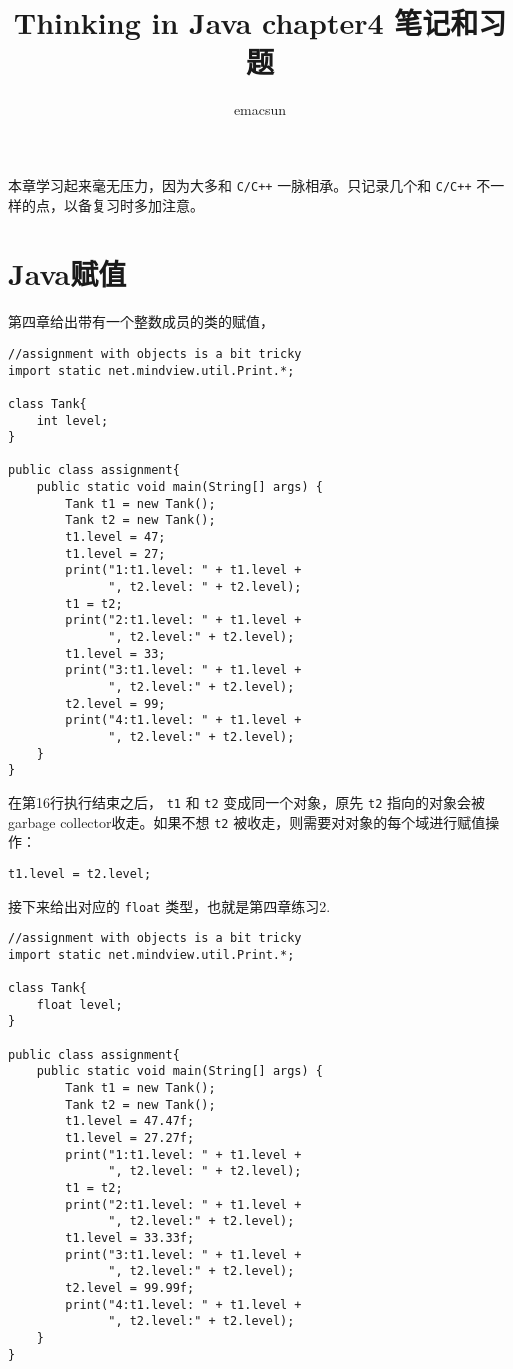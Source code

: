 \documentclass[10pt,a4paper,UTF8]{article}
\author{emacsun}
\date{}
\title{Thinking in Java chapter4 笔记和习题}
\begin{document}
\maketitle
\tableofcontents

本章学习起来毫无压力，因为大多和 \texttt{C/C++} 一脉相承。只记录几个和 \texttt{C/C++} 不一样的点，以备复习时多加注意。

\section{Java赋值}
\label{sec:orgheadline1}


第四章给出带有一个整数成员的类的赋值，
\lstset{language=java,label= ,caption= ,captionpos=b,firstnumber=1,numbers=left}
\begin{lstlisting}
//assignment with objects is a bit tricky
import static net.mindview.util.Print.*;

class Tank{
    int level;
}

public class assignment{
    public static void main(String[] args) {
        Tank t1 = new Tank();
        Tank t2 = new Tank();
        t1.level = 47;
        t1.level = 27;
        print("1:t1.level: " + t1.level +
              ", t2.level: " + t2.level);
        t1 = t2;
        print("2:t1.level: " + t1.level +
              ", t2.level:" + t2.level);
        t1.level = 33;
        print("3:t1.level: " + t1.level +
              ", t2.level:" + t2.level);
        t2.level = 99;
        print("4:t1.level: " + t1.level +
              ", t2.level:" + t2.level);
    }
}
\end{lstlisting}
在第16行执行结束之后， \texttt{t1} 和 \texttt{t2} 变成同一个对象，原先 \texttt{t2} 指向的对象会被garbage collector收走。如果不想 \texttt{t2} 被收走，则需要对对象的每个域进行赋值操作：

\lstset{language=java,label= ,caption= ,captionpos=b,numbers=none}
\begin{lstlisting}
t1.level = t2.level;
\end{lstlisting}


接下来给出对应的 \texttt{float} 类型，也就是第四章练习2.

\lstset{language=java,label= ,caption= ,captionpos=b,firstnumber=1,numbers=left}
\begin{lstlisting}
//assignment with objects is a bit tricky
import static net.mindview.util.Print.*;

class Tank{
    float level;
}

public class assignment{
    public static void main(String[] args) {
        Tank t1 = new Tank();
        Tank t2 = new Tank();
        t1.level = 47.47f;
        t1.level = 27.27f;
        print("1:t1.level: " + t1.level +
              ", t2.level: " + t2.level);
        t1 = t2;
        print("2:t1.level: " + t1.level +
              ", t2.level:" + t2.level);
        t1.level = 33.33f;
        print("3:t1.level: " + t1.level +
              ", t2.level:" + t2.level);
        t2.level = 99.99f;
        print("4:t1.level: " + t1.level +
              ", t2.level:" + t2.level);
    }
}
\end{lstlisting}
\end{document}
